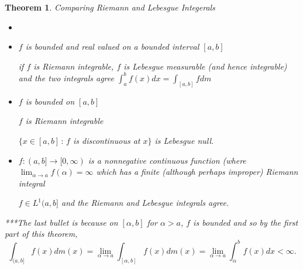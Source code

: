 \documentclass[12pt]{Qual}
\newtheorem{theorem}{Theorem}
\begin{document}
\begin{theorem}{\Large\textit{Comparing Riemann and Lebesgue Integerals}}

\begin{itemize}
\renewcommand\labelitemi{\faPuzzlePiece}
    \item
    \item
{} $f$ is bounded and real valued on a bounded interval $[a,b]$

\hspace{0.1cm}\begin{minipage}{0.85\textwidth}
\vspace{1cm}
if $f$ is Riemann integrable, $f$ is Lebesgue measurable (and hence integrable) and the two integrals agree $\displaystyle\int_a^bf(x)dx=\int_{[a,b]}fdm$
\end{minipage}
\vspace{0.5cm}
    \item {} $f$ is bounded on $[a,b]$

 \begin{minipage}{0.4\textwidth}
$f$ is Riemann integrable
\end{minipage}\hspace{-1cm}\boxed{\iff}\hspace{0.25cm}\begin{minipage}{0.45\textwidth}
$\{x\in[a,b]\,:\,f$ is discontinuous at $x\}$ is Lebesgue null.
\end{minipage}
    \item {}\hspace{0.1cm}\begin{minipage}{0.85\textwidth}
\vspace{1cm}
 $f:(a,b]\to[0,\infty)$ is a nonnegative continuous function (where $\displaystyle\lim_{\alpha\to a}f(\alpha)=\infty$ which has a finite (although perhaps improper) Riemann integral
\end{minipage}
\vspace{0.5cm}

$f\in L^1(a,b]$ and the Riemann and Lebesgue integrals agree.
\vspace{0.5cm}

\end{itemize}


\begin{mybox}
***The last bullet is because on $[\alpha,b]$ for $\alpha>a$, $f$ is bounded and so by the first part of this theorem,  $$\int_{(a,b]}f(x)dm(x)=\lim_{\alpha\to a}\int_{[\alpha,b]}f(x)dm(x)=\lim_{\alpha\to a}\int_\alpha^bf(x)dx<\infty.$$
\end{mybox}

\end{theorem}
\end{document}
